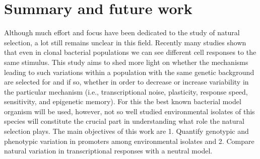 \chapter*{Summary and future work}

\shorthandoff{-}
Although much effort and focus have been dedicated to the study of natural selection, a lot still remains unclear in this field.
Recently many studies shown that even in clonal bacterial populations we can see different cell responses to the same stimulus.
This study aims to shed more light on whether the mechanisms leading to such variations within a population with the same genetic background are selected for and if so, whether in order to decrease or increase variability in the particular mechanism (i.e., transcriptional noise, plasticity, response speed, sensitivity, and epigenetic memory).
For this the best known bacterial model organism  will be used, however, not so well studied environmental isolates of this species will constitute the crucial part in understanding what role the natural selection plays.
The main objectives of this work are 1. Quantify genotypic and phenotypic variation in promoters among environmental  isolates and 2. Compare natural variation in transcriptional responses with a neutral model.

